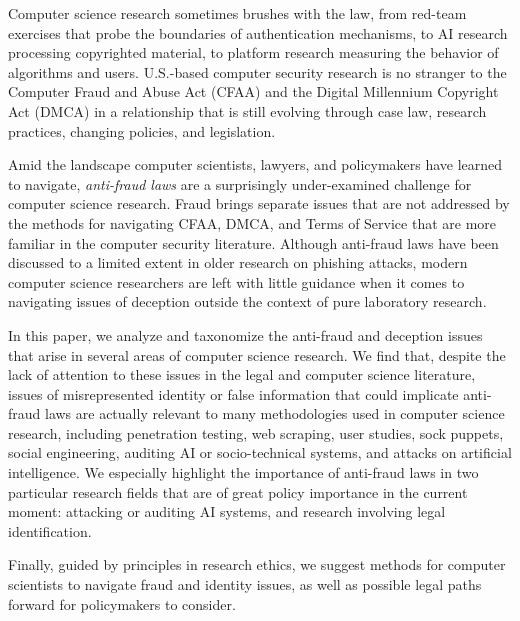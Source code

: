 
Computer science research sometimes brushes with the law,
from red-team exercises that probe the boundaries of authentication mechanisms, to AI research processing copyrighted material, to platform research measuring the behavior of algorithms and users.
U.S.-based computer security research is no stranger to the Computer Fraud and Abuse Act (CFAA) and the Digital Millennium Copyright Act (DMCA)
in a relationship that is still evolving through case law, research practices, changing policies, and legislation.

Amid the landscape computer scientists, lawyers, and policymakers have learned to navigate, \emph{anti-fraud laws} are a surprisingly under-examined challenge for computer science research.
Fraud brings separate issues that are not addressed by the methods for navigating CFAA, DMCA, and Terms of Service that are more familiar in the computer security literature.
Although anti-fraud laws have been discussed to a limited extent in older research on phishing attacks, 
modern computer science researchers are left with little guidance when it comes to navigating issues of  
deception outside the context of pure laboratory research.

In this paper, we analyze and taxonomize the anti-fraud and deception issues that arise in several areas of computer science research.
We find that, despite the lack of attention to these issues in the legal and computer science literature, issues of misrepresented identity or false information that could implicate anti-fraud laws are actually relevant to many methodologies used in computer science research, including penetration testing, web scraping, user studies, sock puppets, social engineering, auditing AI or socio-technical systems, and attacks on artificial intelligence.
We especially highlight the importance of anti-fraud laws in two particular research fields that are of great policy importance in the current moment: attacking or auditing AI systems, and research involving legal identification.

Finally, guided by principles in research ethics, we suggest methods for computer scientists to navigate fraud and identity issues, as well as possible legal paths forward for policymakers to consider.



